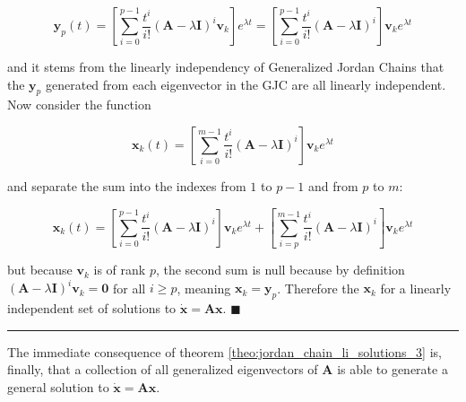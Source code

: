 \begin{equation} \mathbf{y}_p(t) =  \left[\displaystyle\sum\limits_{i=0}^{p-1} \dfrac{t^i}{i!}\left(\mathbf{A} - \lambda\mathbf{I}\right)^{i}\mathbf{v}_k\right] e^{\lambda t} = \left[\displaystyle\sum\limits_{i=0}^{p-1} \dfrac{t^i}{i!}\left(\mathbf{A} - \lambda\mathbf{I}\right)^{i}\right] \mathbf{v}_k e^{\lambda t} \end{equation}

	\noindent and it stems from the linearly independency of Generalized Jordan Chains that the $\mathbf{y}_p$ generated from each eigenvector in the GJC are all linearly independent. Now consider the function

\begin{equation} \mathbf{x}_k(t) =  \left[\displaystyle\sum\limits_{i=0}^{m-1} \dfrac{t^i}{i!}\left(\mathbf{A} - \lambda\mathbf{I}\right)^{i}\right] \mathbf{v}_ke^{\lambda t} \end{equation}

	\noindent and separate the sum into the indexes from $1$ to $p-1$ and from $p$ to $m$:

\begin{equation} \mathbf{x}_k(t) =  \left[\displaystyle\sum\limits_{i=0}^{p-1} \dfrac{t^i}{i!}\left(\mathbf{A} - \lambda\mathbf{I}\right)^{i}\right] \mathbf{v}_ke^{\lambda t} + \left[\displaystyle\sum\limits_{i=p}^{m-1} \dfrac{t^i}{i!}\left(\mathbf{A} - \lambda\mathbf{I}\right)^{i}\right] \mathbf{v}_ke^{\lambda t}\end{equation}

	\noindent but because $\mathbf{v}_k$ is of rank $p$, the second sum is null because by definition $\left(\mathbf{A} - \lambda\mathbf{I}\right)^{i}\mathbf{v}_k = \mathbf{0}$ for all $i \geq p$, meaning $\mathbf{x}_k = \mathbf{y}_p$. Therefore the $\mathbf{x}_k$ for a linearly independent set of solutions to $\dot{\mathbf{x}} = \mathbf{Ax}$.
\hfill$\blacksquare$
\vspace{5mm}
\hrule
\vspace{5mm} %

	The immediate consequence of theorem \ref{theo:jordan_chain_li_solutions_3} is, finally, that a collection of all generalized eigenvectors of $\mathbf{A}$ is able to generate a general solution to $\dot{\mathbf{x}} = \mathbf{Ax}$.

